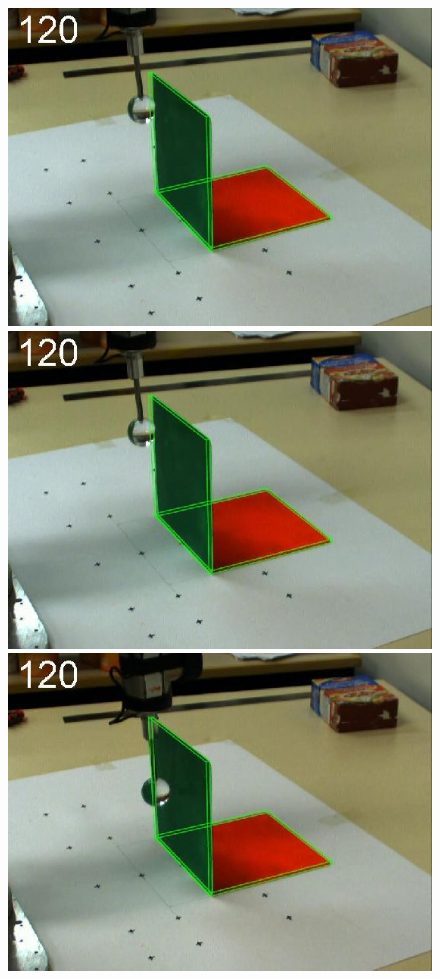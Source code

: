 \begin{figure}[tb]
{\includegraphics[width=\imgBXwid]{./B2_1exp_58_1}
\includegraphics[width=\imgBXwid]{./B2_2exp_58_1}
\includegraphics[width=\imgBXwid]{./B2_2exp_38_1}
}
\end{figure}
